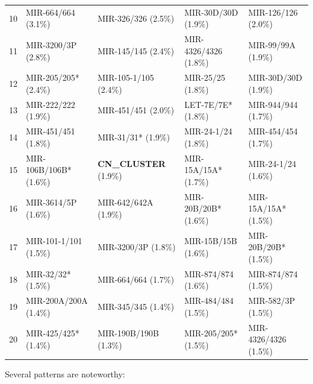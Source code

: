 \begin{table}[!ht]
\begin{tabular}{r|ll|ll}
10 & MIR-664/664 (3.1\%)     & MIR-326/326 (2.5\%)     & MIR-30D/30D (1.9\%)     & MIR-126/126 (2.0\%)     \\
11 & MIR-3200/3P (2.8\%)     & MIR-145/145 (2.4\%)     & MIR-4326/4326 (1.8\%)   & MIR-99/99A (1.9\%)      \\
12 & MIR-205/205* (2.4\%)    & MIR-105-1/105 (2.4\%)   & MIR-25/25 (1.8\%)       & MIR-30D/30D (1.9\%)     \\
13 & MIR-222/222 (1.9\%)     & MIR-451/451 (2.0\%)     & LET-7E/7E* (1.8\%)      & MIR-944/944 (1.7\%)     \\
14 & MIR-451/451 (1.8\%)     & MIR-31/31* (1.9\%)      & MIR-24-1/24 (1.8\%)     & MIR-454/454 (1.7\%)     \\
15 & MIR-106B/106B* (1.6\%)  & \textbf{CN\_CLUSTER} (1.9\%) & MIR-15A/15A* (1.7\%)    & MIR-24-1/24 (1.6\%)     \\
16 & MIR-3614/5P (1.6\%)     & MIR-642/642A (1.9\%)    & MIR-20B/20B* (1.6\%)    & MIR-15A/15A* (1.5\%)    \\
17 & MIR-101-1/101 (1.5\%)   & MIR-3200/3P (1.8\%)     & MIR-15B/15B (1.6\%)     & MIR-20B/20B* (1.5\%)    \\
18 & MIR-32/32* (1.5\%)      & MIR-664/664 (1.7\%)     & MIR-874/874 (1.6\%)     & MIR-874/874 (1.5\%)     \\
19 & MIR-200A/200A (1.4\%)   & MIR-345/345 (1.4\%)     & MIR-484/484 (1.5\%)     & MIR-582/3P (1.5\%)      \\
20 & MIR-425/425* (1.4\%)    & MIR-190B/190B (1.3\%)   & MIR-205/205* (1.5\%)    & MIR-4326/4326 (1.5\%)   \\ \hline
\end{tabular}
\end{table}

Several patterns are noteworthy:

